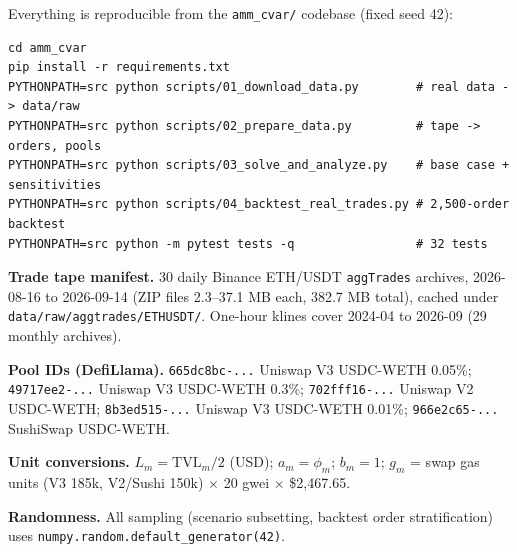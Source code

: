 \documentclass[11pt,a4paper]{article}
\theoremstyle{remark}
\newcommand{\code}[1]{\texttt{#1}}
\begin{document}
Everything is reproducible from the \code{amm\_cvar/} codebase (fixed seed 42):

\begin{lstlisting}[style=logstyle]
cd amm_cvar
pip install -r requirements.txt
PYTHONPATH=src python scripts/01_download_data.py        # real data -> data/raw
PYTHONPATH=src python scripts/02_prepare_data.py         # tape -> orders, pools
PYTHONPATH=src python scripts/03_solve_and_analyze.py    # base case + sensitivities
PYTHONPATH=src python scripts/04_backtest_real_trades.py # 2,500-order backtest
PYTHONPATH=src python -m pytest tests -q                 # 32 tests
\end{lstlisting}

\textbf{Trade tape manifest.}  30 daily Binance ETH/USDT \code{aggTrades} archives,
2026-08-16 to 2026-09-14 (ZIP files 2.3--37.1 MB each, 382.7 MB total), cached under
\code{data/raw/aggtrades/ETHUSDT/}.  One-hour klines cover 2024-04 to 2026-09 (29 monthly
archives).

\textbf{Pool IDs (DefiLlama).}
\code{665dc8bc-...} Uniswap V3 USDC-WETH 0.05\%;
\code{49717ee2-...} Uniswap V3 USDC-WETH 0.3\%;
\code{702fff16-...} Uniswap V2 USDC-WETH;
\code{8b3ed515-...} Uniswap V3 USDC-WETH 0.01\%;
\code{966e2c65-...} SushiSwap USDC-WETH.

\textbf{Unit conversions.}  $L_m=\mathrm{TVL}_m/2$ (USD); $a_m=\phi_m$; $b_m=1$;
$g_m$ = swap gas units (V3 185k, V2/Sushi 150k) $\times$ 20 gwei $\times$ \$2{,}467.65.

\textbf{Randomness.}  All sampling (scenario subsetting, backtest order stratification)
uses \code{numpy.random.default\_generator(42)}.
\end{document}
